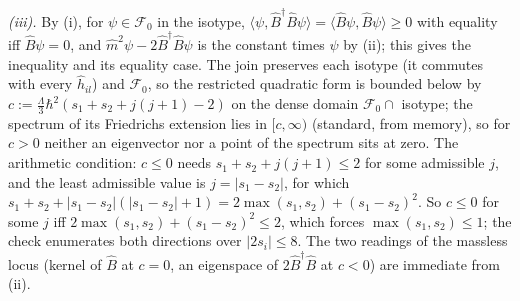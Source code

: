 \emph{(iii).} By (i), for $\psi \in \mathcal{F}_{0}$ in the isotype, $\langle\psi, \hat{B}^{\dagger}\hat{B}\psi\rangle = \langle\hat{B}\psi, \hat{B}\psi\rangle \ge 0$ with equality iff $\hat{B}\psi = 0$, and $\hat{m}^{2}\psi - 2\hat{B}^{\dagger}\hat{B}\psi$ is the constant times $\psi$ by (ii); this gives the inequality and its equality case. The join preserves each isotype (it commutes with every $\hat{h}_{il}$) and $\mathcal{F}_{0}$, so the restricted quadratic form is bounded below by $c := \tfrac{\Lambda}{3}\hbar^{2}(s_{1} + s_{2} + j(j+1) - 2)$ on the dense domain $\mathcal{F}_{0} \cap$ isotype; the spectrum of its Friedrichs extension lies in $[c, \infty)$ (standard, from memory), so for $c > 0$ neither an eigenvector nor a point of the spectrum sits at zero. The arithmetic condition: $c \le 0$ needs $s_{1} + s_{2} + j(j+1) \le 2$ for some admissible $j$, and the least admissible value is $j = |s_{1} - s_{2}|$, for which $s_{1} + s_{2} + |s_{1} - s_{2}|(|s_{1} - s_{2}| + 1) = 2\max(s_{1}, s_{2}) + (s_{1} - s_{2})^{2}$. So $c \le 0$ for some $j$ iff $2\max(s_{1}, s_{2}) + (s_{1} - s_{2})^{2} \le 2$, which forces $\max(s_{1}, s_{2}) \le 1$; the check enumerates both directions over $|2s_{i}| \le 8$. The two readings of the massless locus (kernel of $\hat{B}$ at $c = 0$, an eigenspace of $2\hat{B}^{\dagger}\hat{B}$ at $c < 0$) are immediate from (ii).

